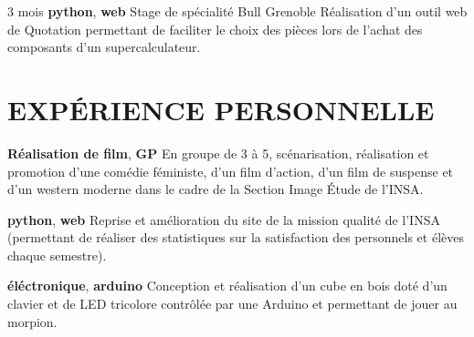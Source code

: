 \documentclass[11pt,a4paper]{moderncv}
\begin{document}
  \cventry
    {3 mois \textbf{python}, \textbf{web}}
    {Stage de spécialité}
    {Bull}
    {Grenoble}
    {}{
      Réalisation d'un outil web de Quotation permettant de faciliter le choix
      des pièces lors de l'achat des composants d'un supercalculateur.
    }





  \section{EXPÉRIENCE PERSONNELLE}

  \cvline
    {\textbf{Réalisation de film}, \textbf{GP}}
    {
      En groupe de 3 à 5, scénarisation, réalisation et promotion d'une comédie
      féministe, d'un film d'action, d'un film de suspense et d'un western
      moderne dans le cadre de la Section Image Étude de l'INSA.
    }{}{}

  \cvline
    {\textbf{python}, \textbf{web}}
    {
      Reprise et amélioration du site de la mission qualité de l'INSA
      (permettant de réaliser des statistiques sur la satisfaction des
      personnels et élèves chaque semestre).
    }{}{}


  \cvline
    {\textbf{éléctronique}, \textbf{arduino}}
    {
      Conception et réalisation d'un cube en bois doté d'un clavier et de LED
      tricolore contrôlée par une Arduino et permettant de jouer au morpion.
    }{}{}
\end{document}
